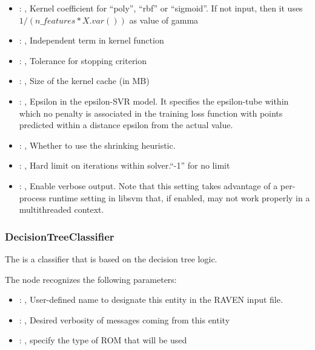 \begin{itemize}
    \item {}: , 
      Kernel coefficient for ``poly'', ``rbf'' or ``sigmoid''. If not input, then it uses
      $1 / (n\_features * X.var())$ as value of gamma

    \item {}: , 
      Independent term in kernel function

    \item {}: , 
      Tolerance for stopping criterion

    \item {}: , 
      Size of the kernel cache (in MB)

    \item {}: , 
      Epsilon in the epsilon-SVR model. It specifies the epsilon-tube
      within which no penalty is associated in the training loss function
      with points predicted within a distance epsilon from the actual
      value.

    \item {}: , 
      Whether to use the shrinking heuristic.

    \item {}: , 
      Hard limit on iterations within solver.``-1'' for no limit

    \item {}: , 
      Enable verbose output. Note that this setting takes advantage
      of a per-process runtime setting in libsvm that, if enabled, may not
      work properly in a multithreaded context.
  \end{itemize}


\subsubsection{DecisionTreeClassifier}
  The  is a classifier that is based on the
  decision tree logic.                          

  The  node recognizes the following parameters:
    \begin{itemize}
      \item {}: , 
        User-defined name to designate this entity in the RAVEN input file.
      \item {}: , 
        Desired verbosity of messages coming from this entity
      \item {}: , 
        specify the type of ROM that will be used
  \end{itemize}

